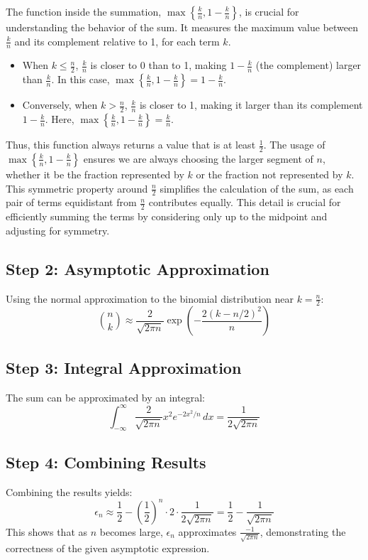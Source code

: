\documentclass[11pt]{article}
\numberwithin{equation}{section}
\theoremstyle{boldStyle}
\begin{document}
The function inside the summation, $\max \left\{ \frac{k}{n}, 1 - \frac{k}{n} \right\}$, is crucial for understanding the behavior of the sum. It measures the maximum value between $\frac{k}{n}$ and its complement relative to 1, for each term $k$.

\begin{itemize}
    \item When $k \leq \frac{n}{2}$, $\frac{k}{n}$ is closer to 0 than to 1, making $1 - \frac{k}{n}$ (the complement) larger than $\frac{k}{n}$. In this case, $\max \left\{ \frac{k}{n}, 1 - \frac{k}{n} \right\} = 1 - \frac{k}{n}$.
    \item Conversely, when $k > \frac{n}{2}$, $\frac{k}{n}$ is closer to 1, making it larger than its complement $1 - \frac{k}{n}$. Here, $\max \left\{ \frac{k}{n}, 1 - \frac{k}{n} \right\} = \frac{k}{n}$.
\end{itemize}

Thus, this function always returns a value that is at least $\frac{1}{2}$. The usage of $\max \left\{ \frac{k}{n}, 1 - \frac{k}{n} \right\}$ ensures we are always choosing the larger segment of $n$, whether it be the fraction represented by $k$ or the fraction not represented by $k$. This symmetric property around $\frac{n}{2}$ simplifies the calculation of the sum, as each pair of terms equidistant from $\frac{n}{2}$ contributes equally. This detail is crucial for efficiently summing the terms by considering only up to the midpoint and adjusting for symmetry.


\subsection*{Step 2: Asymptotic Approximation}
Using the normal approximation to the binomial distribution near $k = \frac{n}{2}$:
\[
    \binom{n}{k} \approx \frac{2}{\sqrt{2\pi n}} \exp\left(-\frac{2(k-n/2)^2}{n}\right)
\]

\subsection*{Step 3: Integral Approximation}
The sum can be approximated by an integral:
\[
    \int_{-\infty}^{\infty} \frac{2}{\sqrt{2\pi n}} x^2 e^{-2x^2/n} \, dx = \frac{1}{2 \sqrt{2\pi n}}
\]

\subsection*{Step 4: Combining Results}
Combining the results yields:
\[
    \epsilon_n \approx \frac{1}{2} - \left(\frac{1}{2}\right)^n \cdot 2 \cdot \frac{1}{2 \sqrt{2\pi n}} = \frac{1}{2} - \frac{1}{\sqrt{2\pi n}}
\]
This shows that as $n$ becomes large, $\epsilon_n$ approximates $\frac{-1}{\sqrt{2\pi n}}$, demonstrating the correctness of the given asymptotic expression.
\end{document}
